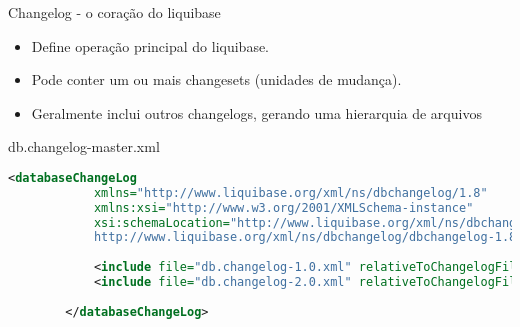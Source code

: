 \begin{frame}[fragile]{Changelog - o coração do liquibase}
\begin{itemize}
    \small \item Define operação principal do liquibase.
    \small \item Pode conter um ou mais changesets (unidades de mudança).
    \small \item Geralmente inclui outros changelogs, gerando uma hierarquia de arquivos
\end{itemize}
\begin{block}{db.changelog-master.xml}
 \begin{lstlisting}[language=XML]
        <databaseChangeLog
            xmlns="http://www.liquibase.org/xml/ns/dbchangelog/1.8"
            xmlns:xsi="http://www.w3.org/2001/XMLSchema-instance"
            xsi:schemaLocation="http://www.liquibase.org/xml/ns/dbchangelog/1.8
            http://www.liquibase.org/xml/ns/dbchangelog/dbchangelog-1.8.xsd">  
            
            <include file="db.changelog-1.0.xml" relativeToChangelogFile="true" />
            <include file="db.changelog-2.0.xml" relativeToChangelogFile="true" />
        
        </databaseChangeLog>
\end{lstlisting}
\end{block}
\end{frame}

